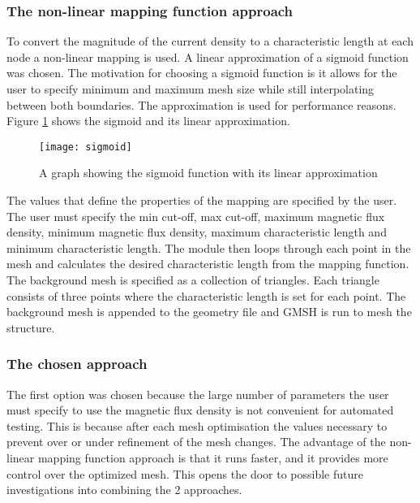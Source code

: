 \subsubsection*{The non-linear mapping function approach}

To convert the magnitude of the current density to a characteristic length at each node a non-linear mapping is used. A linear approximation of a sigmoid function was chosen. The motivation for choosing a sigmoid function is it allows for the user to specify minimum and maximum mesh size while still interpolating between both boundaries. The approximation is used for performance reasons. Figure \ref{fig:sigmoid} shows the sigmoid and its linear approximation.
\begin{figure}[h]
    \centering
    \texttt{[image: sigmoid]}
    \caption{A graph showing the sigmoid function with its linear approximation}
    \label{fig:sigmoid}
\end{figure}
The values that define the properties of the mapping are specified by the user. The user must specify the min cut-off, max cut-off, maximum magnetic flux density, minimum magnetic flux density, maximum characteristic length and minimum characteristic length. The module then loops through each point in the mesh and calculates the desired characteristic length from the mapping function. The background mesh is specified as a collection of triangles. Each triangle consists of three points where the characteristic length is set for each point. The background mesh is appended to the geometry file and GMSH is run to mesh the structure. 

\subsubsection*{The chosen approach}
The first option was chosen because the large number of parameters the user must specify to use the magnetic flux density is not convenient for automated testing. This is because after each mesh optimisation the values necessary to prevent over or under refinement of the mesh changes. The advantage of the non-linear mapping function approach is that it runs faster, and it provides more control over the optimized mesh. This opens the door to possible future investigations into combining the 2 approaches. 

